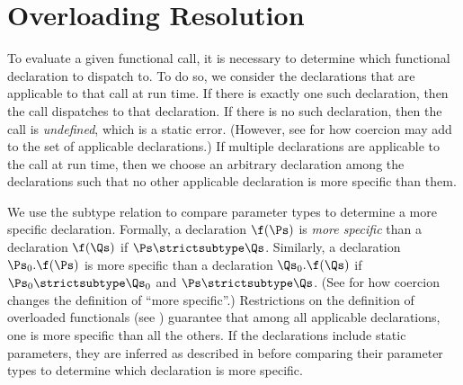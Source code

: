\section{Overloading Resolution}


To evaluate a given functional call,
it is necessary to determine which functional declaration
to dispatch to.
To do so,
we consider the declarations that are applicable to that call at run time.
If there is exactly one such declaration,
then the call dispatches to that declaration.
If there is no such declaration,
then the call is \emph{undefined}, which is a static error.
(However, see 
for how coercion may add to the set of applicable declarations.)
If multiple declarations are applicable to the call at run time,
then we choose an arbitrary declaration among the declarations such that
no other applicable declaration is more specific than them.



We use the subtype relation to compare parameter types to determine
a more specific declaration.
Formally, a declaration $\f(\Ps)$ is \emph{more specific} than a declaration
$\f(\Qs)$ if $\Ps \strictsubtype \Qs$.  Similarly, a declaration
$\Ps_0.\f(\Ps)$ is more specific than a declaration $\Qs_0.\f(\Qs)$
if $\Ps_0 \strictsubtype \Qs_0$ and $\Ps \strictsubtype \Qs$.
(See  for how coercion
changes the definition of ``more specific''.)
Restrictions on the definition of overloaded functionals
(see )
guarantee that among all applicable declarations,
one is more specific than all the others.
If the declarations include static parameters,
they are inferred as described in 
before comparing their parameter types
to determine which declaration is more specific.
